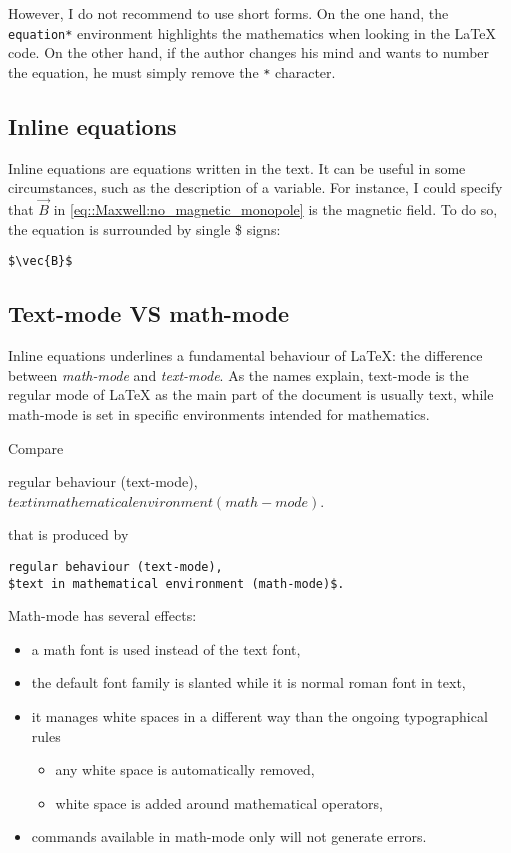 		However, I do not recommend to use short forms. 
		On the one hand, the \texttt{equation*} environment highlights the mathematics when looking in the \LaTeX{} code.
		On the other hand, if the author changes his mind and wants to number the equation, he must simply remove the \texttt{*} character.
	
	
	
	\subsection{Inline equations}
	
	
		Inline equations are equations written in the text.
		It can be useful in some circumstances, such as the description of a variable.
		For instance, I could specify that $\vec{B}$ in \cref{eq::Maxwell:no_magnetic_monopole} is the magnetic field.
		To do so, the equation is surrounded by single \$ signs:
\begin{lstlisting}[language={[LaTeX]TeX}]
$\vec{B}$
\end{lstlisting}



	\subsection{Text-mode VS math-mode}
	
		Inline equations underlines a fundamental behaviour of \LaTeX{}: the difference between \emph{math-mode} and \emph{text-mode}.
		As the names explain, text-mode is the regular mode of \LaTeX{} as the main part of the document is usually text, while math-mode is set in specific environments intended for mathematics.
		
		Compare
		\begin{center}
			regular behaviour (text-mode),
			$text in mathematical environment (math-mode)$.
		\end{center}
		that is produced by
\begin{lstlisting}[language={[LaTeX]TeX}]
regular behaviour (text-mode),
$text in mathematical environment (math-mode)$.
\end{lstlisting}
	
	
		Math-mode has several effects:
		\begin{itemize}
			\item a math font is used instead of the text font,
			\item the default font family is slanted while it is normal roman font in text,
			\item it manages white spaces in a different way than the ongoing typographical rules
				\begin{itemize}
					\item any white space is automatically removed,
					\item white space is added around mathematical operators,
				\end{itemize}
			\item commands available in math-mode only will not generate errors.
		\end{itemize}
	
